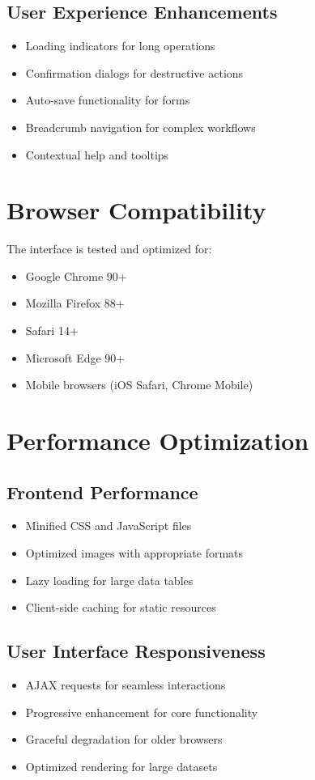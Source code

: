 \subsection{User Experience Enhancements}
\begin{itemize}
    \item Loading indicators for long operations
    \item Confirmation dialogs for destructive actions
    \item Auto-save functionality for forms
    \item Breadcrumb navigation for complex workflows
    \item Contextual help and tooltips
\end{itemize}

\section{Browser Compatibility}

The interface is tested and optimized for:
\begin{itemize}
    \item Google Chrome 90+
    \item Mozilla Firefox 88+
    \item Safari 14+
    \item Microsoft Edge 90+
    \item Mobile browsers (iOS Safari, Chrome Mobile)
\end{itemize}

\section{Performance Optimization}

\subsection{Frontend Performance}
\begin{itemize}
    \item Minified CSS and JavaScript files
    \item Optimized images with appropriate formats
    \item Lazy loading for large data tables
    \item Client-side caching for static resources
\end{itemize}

\subsection{User Interface Responsiveness}
\begin{itemize}
    \item AJAX requests for seamless interactions
    \item Progressive enhancement for core functionality
    \item Graceful degradation for older browsers
    \item Optimized rendering for large datasets
\end{itemize}